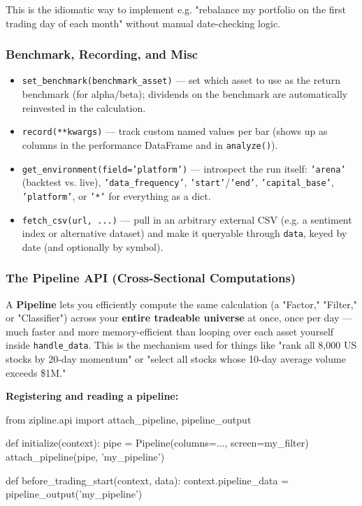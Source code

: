 \documentclass[12pt,openany]{book}
\theoremstyle{definition}
\theoremstyle{remark}
\begin{document}
This is the idiomatic way to implement e.g. "rebalance my portfolio on the first trading day of each month" without manual date-checking logic.
\subsubsection{Benchmark, Recording, and Misc}

\begin{itemize}
\item 
\texttt{set\_benchmark(benchmark\_asset)} — set which asset to use as the return benchmark (for alpha/beta); dividends on the benchmark are automatically reinvested in the calculation.

\item 
\texttt{record(**kwargs)} — track custom named values per bar (shows up as columns in the performance DataFrame and in \texttt{analyze()}).

\item 
\texttt{get\_environment(field='platform')} — introspect the run itself: \texttt{'arena'} (backtest vs. live), \texttt{'data\_frequency'}, \texttt{'start'}/\texttt{'end'}, \texttt{'capital\_base'}, \texttt{'platform'}, or \texttt{'*'} for everything as a dict.

\item 
\texttt{fetch\_csv(url, ...)} — pull in an arbitrary external CSV (e.g. a sentiment index or alternative dataset) and make it queryable through \texttt{data}, keyed by date (and optionally by symbol).

\end{itemize}
\subsubsection{The Pipeline API (Cross-Sectional Computations)}

A \textbf{Pipeline} lets you efficiently compute the same calculation (a "Factor," "Filter," or "Classifier") across your \textbf{entire tradeable universe} at once, once per day — much faster and more memory-efficient than looping over each asset yourself inside \texttt{handle\_data}. This is the mechanism used for things like "rank all 8,000 US stocks by 20-day momentum" or "select all stocks whose 10-day average volume exceeds \$1M."

\textbf{Registering and reading a pipeline:}

\begin{python}
from zipline.api import attach_pipeline, pipeline_output

def initialize(context):
    pipe = Pipeline(columns={...}, screen=my_filter)
    attach_pipeline(pipe, 'my_pipeline')

def before_trading_start(context, data):
    context.pipeline_data = pipeline_output('my_pipeline')
\end{python}
\end{document}
